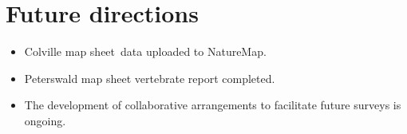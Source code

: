 \documentclass[version=last,
    paper=a4, %
    10pt, %
    usenames,
    dvipsnames,
    oneside, %
    headings=openany, %
    DIV=15 %
]{scrbook}
\begin{document}
\section*{Future directions}
\begin{itemize}
\itemsep1pt\parskip0pt
\item
  Colville map sheet~data uploaded to NatureMap.
\item
  Peterswald map sheet vertebrate report completed.
\item
  The development of collaborative arrangements to facilitate future
  surveys is ongoing.
\end{itemize}

~



\end{document}
